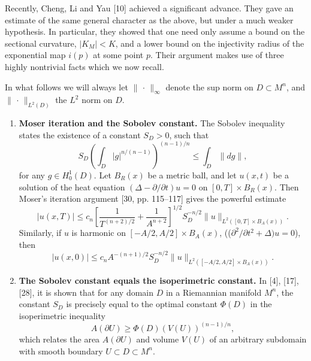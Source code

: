 Recently, Cheng, Li and Yau [10] achieved a significant advance. They gave
an estimate of the same general character as the above, but under a much
weaker hypothesis. In particular, they showed that one need only assume a
bound on the sectional curvature, $\lvert K_M\rvert < K$, and a lower bound on the
injectivity radius of the exponential map $i(p)$ at some point $p$. Their argument
makes use of three highly nontrivial facts which we now recall.

In what follows we will always let $\lVert \,\cdot\, \rVert_\infty$ denote the sup norm on
$D \subset M^n$, and $\lVert \,\cdot\, \rVert_{L^2(D)}$ the $L^2$ norm on $D$.

\begin{enumerate}
\item \textbf{Moser iteration and the Sobolev constant.} The Sobolev inequality
states the existence of a constant $S_D>0$, such that
\begin{equation}
S_D\left(\int_D \lvert g\rvert^{n/(n-1)}\right)^{(n-1)/n}
\le \int_D \lVert dg\rVert,
\tag{0.2}
\end{equation}
for any $g\in H_0^1(D)$. Let $B_R(x)$ be a metric ball, and let $u(x,t)$ be a solution of
the heat equation $(\Delta-\partial/\partial t)u=0$ on $[0,T]\times B_R(x)$. Then Moser's iteration
argument [30, pp. 115--117] gives the powerful estimate
\begin{equation}
\lvert u(x,T)\rvert \le c_n\left[\frac{1}{T^{(n+2)/2}}+\frac{1}{A^{n+2}}\right]^{1/2}
S_D^{-n/2}\lVert u\rVert_{L^2([0,T]\times B_A(x))}.
\tag{0.3}
\end{equation}
Similarly, if $u$ is harmonic on $[-A/2,A/2]\times B_A(x)$, (($\partial^2/\partial t^2+\Delta)u=0$),
then
\begin{equation}
\lvert u(x,0)\rvert \le c_n A^{-(n+1)/2}S_D^{-n/2}\lVert u\rVert_{L^2([-A/2,A/2]\times B_A(x))}.
\tag{0.3$'$}
\end{equation}

\item \textbf{The Sobolev constant equals the isoperimetric constant.} In [4], [17],
[28], it is shown that for any domain $D$ in a Riemannian manifold $M^n$, the
constant $S_D$ is precisely equal to the optimal constant $\Phi(D)$ in the isoperimetric inequality
\begin{equation}
A(\partial U)\ge \Phi(D)(V(U))^{(n-1)/n},
\tag{0.4}
\end{equation}
which relates the area $A(\partial U)$ and volume $V(U)$ of an arbitrary subdomain
with smooth boundary $U\subset D\subset M^n$.


\end{enumerate}
